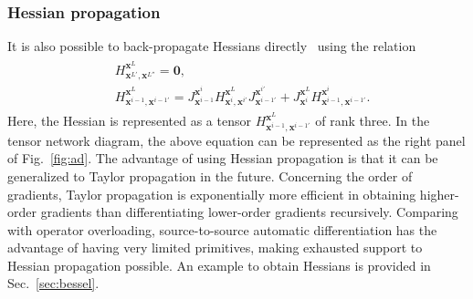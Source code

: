 \documentclass{article}
\newcommand{\<}{\langle}
\renewcommand{\>}{\rangle}
\newcommand{\out}{{\vx^L}}
\newcommand{\vx}{{\mathbf{x}}}
\newcommand{\Fig}[1]{Fig.~\ref{#1}}
\newcommand{\Sec}[1]{Sec.~\ref{#1}}
\theoremstyle{definition}\newtheorem{definition}{\textit{Definition}}
\begin{document}
\subsubsection{Hessian propagation}\label{sec:taylor}
It is also possible to back-propagate Hessians directly~\cite{Martens2012} using the relation
\begin{align}
    \begin{split}
        &H^{\out}_{\vx^{L'},\vx^{L''}} = \mathbf{0},\\
        &H^{\out}_{\vx^{i-1},\vx^{i-1'}} = J^{\vx^i}_{\vx^{i-1}} H^{\out}_{\vx^i, \vx^{i'}} J^{\vx^{i'}}_{\vx^{i-1'}} + J^{\out}_{\vx^i} H^{\vx^i}_{\vx^{i-1}, \vx^{i-1'}}.
    \end{split}
\end{align}
Here, the Hessian is represented as a tensor $H^{\out}_{\vx^{i-1},\vx^{i-1'}}$ of rank three.
In the tensor network diagram, the above equation can be represented as the right panel of \Fig{fig:ad}.
The advantage of using Hessian propagation is that it can be generalized to Taylor propagation in the future.
Concerning the order of gradients, Taylor propagation is exponentially more efficient in obtaining higher-order gradients than differentiating lower-order gradients recursively. %
Comparing with operator overloading, source-to-source automatic differentiation has the advantage of having very limited primitives, making exhausted support to Hessian propagation possible.
An example to obtain Hessians is provided in \Sec{sec:bessel}.
\end{document}
